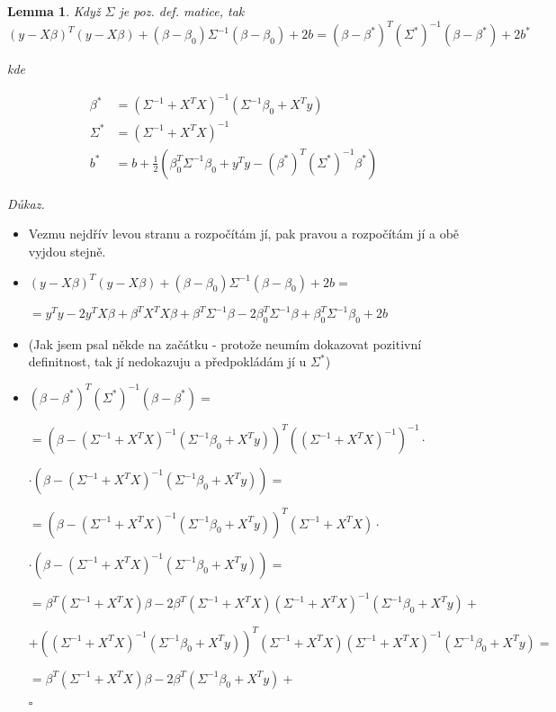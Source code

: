 \documentclass{article}
\newenvironment{pitemize}{
\begin{itemize}
  \setlength{\itemsep}{5pt}
  \setlength{\parskip}{0pt}
  \setlength{\parsep}{0pt}
}{\end{itemize}}
\newenvironment{pproof}{
\noindent\emph{Důkaz.}
\begin{pitemize}
}{\hfill$\square$\end{pitemize}}
\newtheorem{lemma}{Lemma}
\theoremstyle{definition}
\begin{document}
\begin{lemma}
\label{pozdefpoc}
Když $\Sigma$ je poz. def. matice, tak
$$(y-X\beta)^T(y-X\beta) +(\beta-\beta_0)\Sigma^{-1}(\beta-\beta_0)
+2b
=
(\beta-\beta^*)^T(\Sigma^*)^{-1}(\beta-\beta^*)+2b^*$$

kde

\begin{align*}
\beta^* &= (\Sigma^{-1}+X^TX)^{-1}(\Sigma^{-1}\beta_0+X^Ty) \\
\Sigma^* &= (\Sigma^{-1}+X^TX)^{-1} \\
b^* &= b+\frac{1}{2}(\beta_0^T\Sigma^{-1}\beta_0+y^Ty
-(\beta^*)^T(\Sigma^*)^{-1}\beta^*)
\end{align*}

\end{lemma}
\begin{pproof}
\item Vezmu nejdřív levou stranu a rozpočítám jí, pak pravou a rozpočítám jí a obě vyjdou stejně.
\item $(y-X\beta)^T(y-X\beta) +(\beta-\beta_0)\Sigma^{-1}(\beta-\beta_0)
+2b=$

$=y^Ty-2y^TX\beta+\beta^TX^TX\beta
+\beta^T\Sigma^{-1}\beta-2\beta_0^T\Sigma^{-1}\beta
+\beta_0^T\Sigma^{-1}\beta_0+2b$

\item (Jak jsem psal někde na začátku - protože neumím dokazovat pozitivní definitnost, tak jí nedokazuju a předpokládám jí u $\Sigma^*$)

\item $(\beta-\beta^*)^T(\Sigma^*)^{-1}(\beta-\beta^*)=$

$= (\beta- (\Sigma^{-1}+X^TX)^{-1}(\Sigma^{-1}\beta_0+X^Ty))^T((\Sigma^{-1}+X^TX)^{-1} )^{-1}\cdot$
\nopagebreak

$\cdot(\beta-(\Sigma^{-1}+X^TX)^{-1}(\Sigma^{-1}\beta_0+X^Ty))=$

$= (\beta- (\Sigma^{-1}+X^TX)^{-1}(\Sigma^{-1}\beta_0+X^Ty))^T
(\Sigma^{-1}+X^TX)\cdot$
\nopagebreak

$\cdot(\beta-(\Sigma^{-1}+X^TX)^{-1}(\Sigma^{-1}\beta_0+X^Ty))=$

$=\beta^T(\Sigma^{-1}+X^TX)\beta-
2\beta^T(\Sigma^{-1}+X^TX)(\Sigma^{-1}+X^TX)^{-1}(\Sigma^{-1}\beta_0+X^Ty)
+ $
\nopagebreak

$+(
(\Sigma^{-1}+X^TX)^{-1}(\Sigma^{-1}\beta_0+X^Ty)
)^T
(\Sigma^{-1}+X^TX)
(\Sigma^{-1}+X^TX)^{-1}(\Sigma^{-1}\beta_0+X^Ty)=
$

$=\beta^T(\Sigma^{-1}+X^TX)\beta-
2\beta^T(\Sigma^{-1}\beta_0+X^Ty)
+ $
\nopagebreak


\end{pproof}
\end{document}
